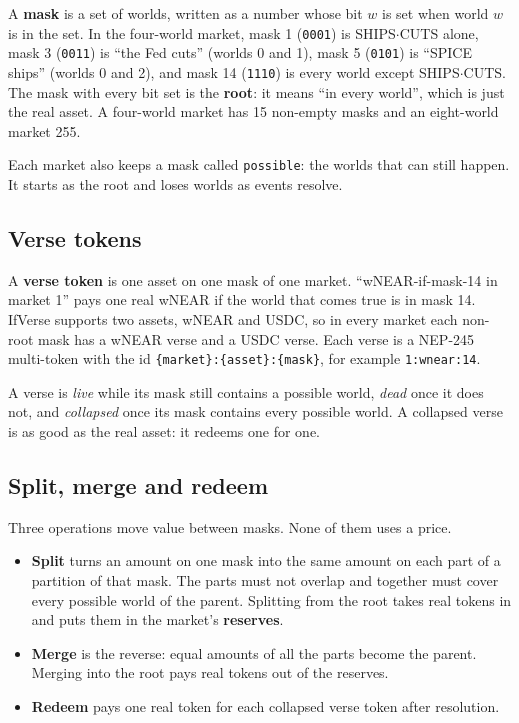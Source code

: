 \documentclass[11pt,a4paper]{article}
\newcommand{\wSC}{\textsf{SHIPS$\cdot$CUTS}}
\newcommand{\code}[1]{\texttt{\small #1}}
\begin{document}
A \textbf{mask} is a set of worlds, written as a number whose bit $w$ is set when world $w$ is in the set. In the
four-world market, mask 1 (\code{0001}) is \wSC{} alone, mask 3 (\code{0011}) is ``the Fed cuts'' (worlds 0 and 1),
mask 5 (\code{0101}) is ``SPICE ships'' (worlds 0 and 2), and mask 14 (\code{1110}) is every world except \wSC.
The mask with every bit set is the \textbf{root}: it means ``in every world'', which is just the real asset.
A four-world market has 15 non-empty masks and an eight-world market 255.

Each market also keeps a mask called \code{possible}: the worlds that can still happen. It starts as the root and
loses worlds as events resolve.

\subsection{Verse tokens}

A \textbf{verse token} is one asset on one mask of one market. ``wNEAR-if-mask-14 in market 1'' pays one real wNEAR
if the world that comes true is in mask 14. IfVerse supports two assets, wNEAR and USDC, so in every market each
non-root mask has a wNEAR verse and a USDC verse. Each verse is a NEP-245 multi-token \cite{nep245} with the id
\code{\{market\}:\{asset\}:\{mask\}}, for example \code{1:wnear:14}.

A verse is \emph{live} while its mask still contains a possible world, \emph{dead} once it does not, and
\emph{collapsed} once its mask contains every possible world. A collapsed verse is as good as the real asset: it
redeems one for one.

\subsection{Split, merge and redeem}

Three operations move value between masks. None of them uses a price.

\begin{itemize}
\item \textbf{Split} turns an amount on one mask into the same amount on each part of a partition of that mask. The
parts must not overlap and together must cover every possible world of the parent. Splitting from the root takes
real tokens in and puts them in the market's \textbf{reserves}.
\item \textbf{Merge} is the reverse: equal amounts of all the parts become the parent. Merging into the root pays
real tokens out of the reserves.
\item \textbf{Redeem} pays one real token for each collapsed verse token after resolution.
\end{itemize}
\end{document}
